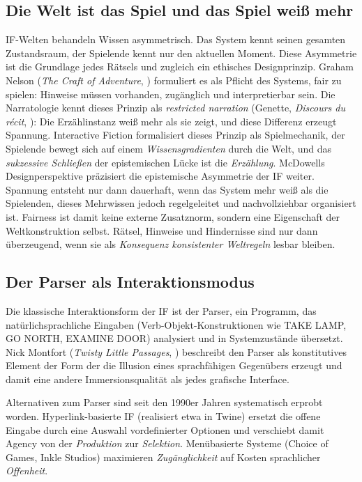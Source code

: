 \documentclass[parskip=half,a4paper,11pt]{scrreprt}
\begin{document}
\subsection{Die Welt ist das Spiel und das Spiel weiß mehr}

IF-Welten behandeln Wissen asymmetrisch. Das System kennt seinen gesamten Zustandsraum, der Spielende kennt nur den aktuellen Moment. Diese Asymmetrie ist die Grundlage jedes Rätsels und zugleich ein ethisches Designprinzip. Graham Nelson (\textit{The Craft of Adventure}, \citep{Nelson1994}) formuliert es als Pflicht des Systems, fair zu spielen: Hinweise müssen vorhanden, zugänglich und interpretierbar sein. Die Narratologie kennt dieses Prinzip als \textit{restricted narration} (Genette, \textit{Discours du récit}, \citep{Genette1972}): Die Erzählinstanz weiß mehr als sie zeigt, und diese Differenz erzeugt Spannung. Interactive Fiction formalisiert dieses Prinzip als Spielmechanik, der Spielende bewegt sich auf einem \textit{Wissensgradienten} durch die Welt, und das \textit{sukzessive Schließen} der epistemischen Lücke ist die\textit{ Erzählung}. McDowells Designperspektive präzisiert die epistemische Asymmetrie der IF weiter. Spannung entsteht nur dann dauerhaft, wenn das System mehr weiß als die Spielenden, dieses Mehrwissen jedoch regelgeleitet und nachvollziehbar organisiert ist. Fairness ist damit keine externe Zusatznorm, sondern eine Eigenschaft der Weltkonstruktion selbst. Rätsel, Hinweise und Hindernisse sind nur dann überzeugend, wenn sie als \textit{Konsequenz konsistenter Weltregeln} lesbar bleiben.

\subsection{Der Parser als Interaktionsmodus}

Die klassische Interaktionsform der IF ist der Parser, ein Programm, das natürlichsprachliche Eingaben (Verb-Objekt-Konstruktionen wie TAKE LAMP, GO NORTH, EXAMINE DOOR) analysiert und in Systemzustände übersetzt. Nick Montfort (\textit{Twisty Little Passages}, \citep{Montfort2003}) beschreibt den Parser als konstitutives Element der Form der die Illusion eines sprachfähigen Gegenübers  erzeugt und damit eine andere Immersionsqualität als jedes grafische Interface.

Alternativen zum Parser sind seit den 1990er Jahren systematisch erprobt worden. Hyperlink-basierte IF (realisiert etwa in Twine) ersetzt die offene Eingabe durch eine Auswahl vordefinierter Optionen und verschiebt damit Agency von der \textit{Produktion} zur\textit{ Selektion}. Menübasierte Systeme (Choice of Games, Inkle Studios) maximieren \textit{Zugänglichkeit} auf Kosten sprachlicher \textit{Offenheit}.
\end{document}
